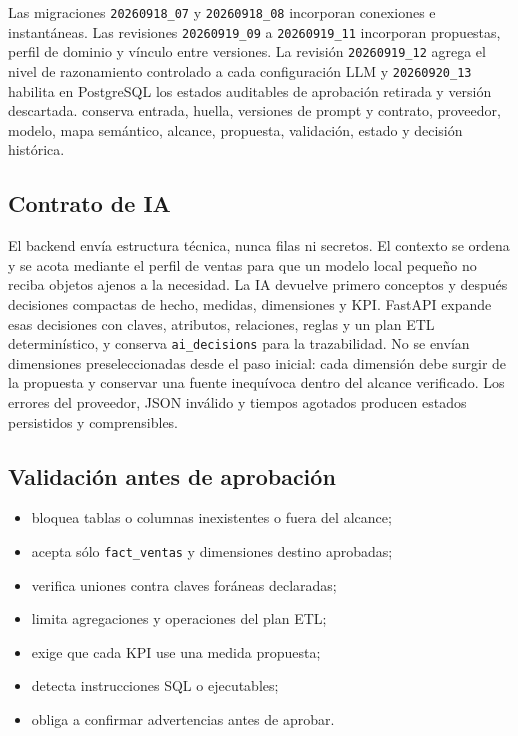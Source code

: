 \documentclass[11pt,letterpaper]{article}
\newcommand{\file}[1]{\texttt{#1}}
\begin{document}
Las migraciones \file{20260918\_07} y \file{20260918\_08} incorporan conexiones e instantáneas. Las revisiones \file{20260919\_09} a \file{20260919\_11} incorporan propuestas, perfil de dominio y vínculo entre versiones. La revisión \file{20260919\_12} agrega el nivel de razonamiento controlado a cada configuración LLM y \file{20260920\_13} habilita en PostgreSQL los estados auditables de aprobación retirada y versión descartada.  conserva entrada, huella, versiones de prompt y contrato, proveedor, modelo, mapa semántico, alcance, propuesta, validación, estado y decisión histórica.

\subsection{Contrato de IA}

El backend envía estructura técnica, nunca filas ni secretos. El contexto se ordena y se acota mediante el perfil de ventas para que un modelo local pequeño no reciba objetos ajenos a la necesidad. La IA devuelve primero conceptos y después decisiones compactas de hecho, medidas, dimensiones y KPI. FastAPI expande esas decisiones con claves, atributos, relaciones, reglas y un plan ETL determinístico, y conserva \file{ai\_decisions} para la trazabilidad. No se envían dimensiones preseleccionadas desde el paso inicial: cada dimensión debe surgir de la propuesta y conservar una fuente inequívoca dentro del alcance verificado. Los errores del proveedor, JSON inválido y tiempos agotados producen estados persistidos y comprensibles.

\subsection{Validación antes de aprobación}

\begin{itemize}
  \item bloquea tablas o columnas inexistentes o fuera del alcance;
  \item acepta sólo \file{fact\_ventas} y dimensiones destino aprobadas;
  \item verifica uniones contra claves foráneas declaradas;
  \item limita agregaciones y operaciones del plan ETL;
  \item exige que cada KPI use una medida propuesta;
  \item detecta instrucciones SQL o ejecutables;
  \item obliga a confirmar advertencias antes de aprobar.
\end{itemize}
\end{document}
